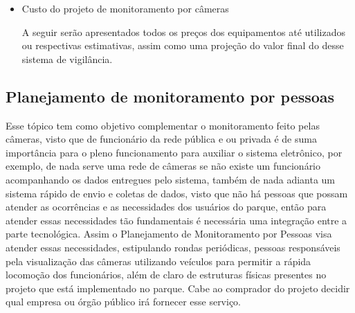 \begin{itemize}
\end{itemize}

\begin{itemize}
	\item Custo do projeto de monitoramento por câmeras
	
	A seguir serão apresentados todos os preços dos equipamentos até utilizados ou respectivas estimativas, assim como uma projeção do valor final do desse sistema de vigilância.
\end{itemize}

\subsection{Planejamento de monitoramento por pessoas}

  	Esse tópico tem como objetivo complementar o monitoramento feito pelas câmeras, visto que de funcionário da rede pública e ou privada é de suma importância para o pleno funcionamento para auxiliar o sistema eletrônico, por exemplo, de nada serve uma rede de câmeras se não existe um funcionário acompanhando os dados entregues pelo sistema, também de nada adianta um sistema rápido de envio e coletas de dados, visto que não há pessoas que possam atender as ocorrências e as necessidades dos usuários do parque, então para atender essas necessidades tão fundamentais é necessária uma integração entre a parte tecnológica. Assim o Planejamento de Monitoramento por Pessoas visa atender essas necessidades, estipulando rondas periódicas, pessoas responsáveis pela visualização das câmeras utilizando veículos para permitir a rápida locomoção dos funcionários, além de claro de estruturas físicas presentes no projeto que está implementado no parque. Cabe ao comprador do projeto decidir qual empresa ou órgão público irá fornecer esse serviço.
  	
